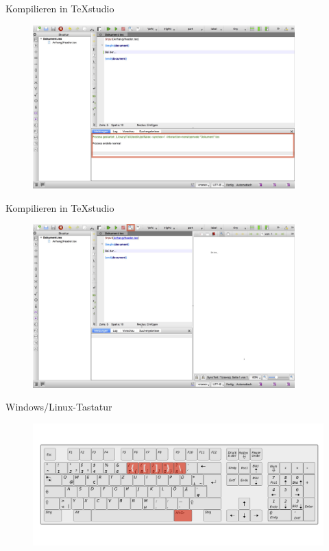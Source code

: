 \begin{frame}[c]{Kompilieren in TeXstudio}
	\begin{figure}[htbp]
\centering
\includegraphics[width=0.9\textwidth]{img/editor/3.jpg}
\end{figure}
\end{frame}

\begin{frame}[c]{Kompilieren in TeXstudio}
	\begin{figure}[htbp]
\centering
\includegraphics[width=0.9\textwidth]{img/editor/4.jpg}
\end{figure}
\end{frame}

\begin{frame}[c]{Windows/Linux-Tastatur}
	\begin{figure}[htbp]
\centering
\includegraphics[width=1.0\textwidth]{img/tastatur/tastatur_win.png}
\end{figure}
\end{frame}

